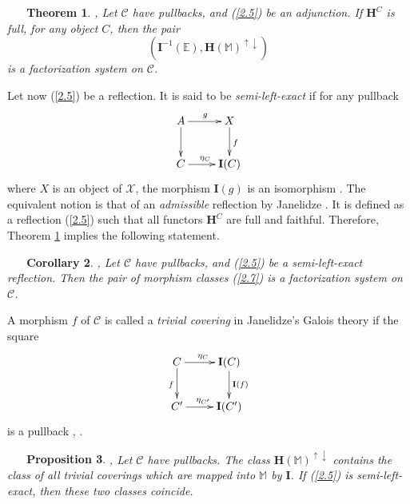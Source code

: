\documentclass[12pt,reqno,intlim]{amsart}
\numberwithin{equation}{section}
\newtheorem{theo}{\ \ \ Theorem}[section]
\newtheorem{prop}[theo]{\ \ \ Proposition}
\newtheorem{cor}[theo]{\ \ \ Corollary}
\theoremstyle{definition}
\theoremstyle{remark}
\begin{document}
\begin{theo} \cite[Therem 3.7]{Z2}, \cite[Theorem 3.6]{Z3} \label{th2.1.1}
Let $\mathcal{C}$ have pullbacks, and (\ref{2.5}) be an adjunction. If $\mathbf{H}^{C}$ is full, for any object $C$, then the pair 
\begin{equation} \label{2.7}
(\mathbf{I}^{-1}(\mathbb{E}), \mathbf{H}(\mathbb{M})^{\uparrow\downarrow})
\end{equation}
is a factorization system on $\mathcal{C}$. 
\end{theo}
 

Let now (\ref{2.5}) be a reflection. It is said to be \textit{semi-left-exact} if for any pullback
\begin{equation}
\xymatrix{A\ar[r]^{g}\ar[d]&X\ar[d]^{f}\\
C\ar[r]^{\eta_C}&\mathbf{I}(C)}
\end{equation}
where $X$ is an object of $\mathcal{X}$, the morphism $\mathbf{I}(g)$ is an isomorphism \cite{CHK}. The equivalent notion is that of an \textit{admissible} reflection by Janelidze \cite{J}. It is defined as a reflection (\ref{2.5}) such that all functors $\mathbf{H}^C$  are full and faithful. Therefore, Theorem \ref{th2.1.1} implies the following statement.



\begin{cor} \cite[Therem 3.7]{Z2}, \cite[Theorem 2.5]{Z1} \label{th2.1}
Let $\mathcal{C}$ have pullbacks, and (\ref{2.5}) be a semi-left-exact reflection.  Then the pair of morphism classes (\ref{2.7})
is a factorization system on $\mathcal{C}$. 
\end{cor}

A morphism $f$ of $\mathcal{C}$ is called a \textit{trivial covering} in Janelidze's Galois theory if the square 
\begin{equation}
\xymatrix{C\ar[r]^{\eta_C}\ar[d]_{f}&\mathbf{I}(C)\ar[d]^{\mathbf{I}(f)}\\
C'\ar[r]^{\eta_{C'}}&\mathbf{I}(C')}
\end{equation}
is a pullback \cite{J}, \cite{J1}.

\begin{prop} \cite[Lemma 2.3]{Z1}, \cite[Corollary 2.6]{Z1} \label{prop2.2}
Let $\mathcal{C}$ have pullbacks. The class $\mathbf{H}(\mathbb{M})^{\uparrow\downarrow}$ contains the class of all trivial coverings which are mapped into $\mathbb{M}$  by $\mathbf{I}$.  If (\ref{2.5}) is  semi-left-exact, then these two classes coincide.
\end{prop}
\end{document}
